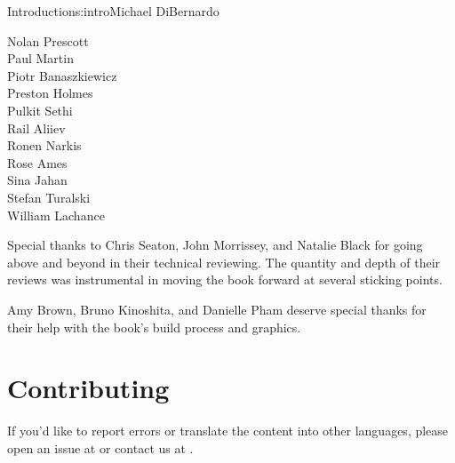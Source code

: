 \begin{aosachapter}{Introduction}{s:intro}{Michael DiBernardo}
\begin{multicols}{3}
Nolan Prescott \\
Paul Martin \\
Piotr Banaszkiewicz \\
Preston Holmes \\
Pulkit Sethi \\
Rail Aliiev \\
Ronen Narkis \\
Rose Ames \\
Sina Jahan \\
Stefan Turalski \\
William Lachance \\
\end{multicols}

\newpage  %

\noindent Special thanks to Chris Seaton, John Morrissey, and Natalie Black for going above and beyond in their technical reviewing. The quantity and depth of their reviews was instrumental in moving the book forward at several sticking points.

Amy Brown, Bruno Kinoshita, and Danielle Pham deserve special thanks
for their help with the book's build process and graphics.


\section*{Contributing}

If you'd like to report errors or translate the content into other languages,
please open an issue at  or contact us at
.

\end{aosachapter}
